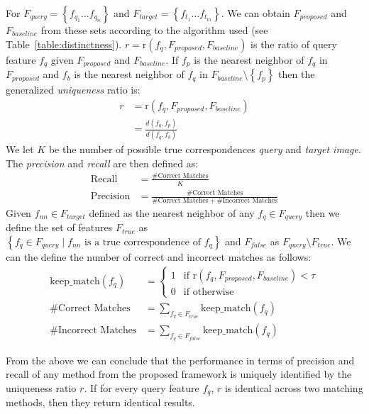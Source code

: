 \documentclass[journal]{IEEEtran}
\newcommand{\twopartdef}[4]
{
	\left\{
		\begin{array}{ll}
			#1 & \mbox{if } #2 \\
			#3 & \mbox{if } #4
		\end{array}
	\right.
}
\begin{document}
For $F_{query} = \left\{f_{q_1} \ldots f_{q_n}\right\}$ and $F_{target} 
= \left\{f_{t_1} \ldots f_{t_m}\right\}$.  We can obtain $F_{proposed}$ 
and $F_{baseline}$ from these sets according to the algorithm used (see 
Table~\ref{table:distinctness}). $r = \text{r}(f_{q}, F_{proposed}, 
F_{baseline})$ is the ratio of query feature $f_{q}$ given 
$F_{proposed}$ and $F_{baseline}$.  If $f_{p}$ is the nearest neighbor 
of $f_{q}$ in $F_{proposed}$ and $f_{b}$ is the nearest neighbor of 
$f_{q}$ in $F_{baseline} \setminus \left\{f_{p}\right\}$ then the 
generalized \emph{uniqueness} ratio is:
\begin{align*}
    r &= \text{r}(f_{q}, F_{proposed}, F_{baseline}) \\
        &= \frac{d(f_{q}, f_{p})}{d(f_{q}, f_{b})}
\end{align*}
We let $K$ be the number of possible true correspondences \emph{query} 
and \emph{target image}. The \emph{precision} and \emph{recall} are then 
defined as:
\begin{align*}
    \textrm{Recall} &= \frac{\#\textrm{Correct Matches}}{K} \\
    \textrm{Precision} &= \frac{\#\textrm{Correct 
    Matches}}{\#\textrm{Correct Matches} + \#\textrm{Incorrect Matches}}
\end{align*}
Given $f_{nn} \in F_{target}$ defined as the nearest neighbor of any 
$f_q \in F_{query}$ then we define the set of features $F_{true}$ as 
$\left\{ f_{q} \in F_{query} \mid f_{nn} \text{ is a true correspondence 
of } f_{q} \right\}$ and $F_{false}$ as $F_{query} \setminus F_{true}$.  
We can the define the number of correct and incorrect matches as 
follows:
\begin{align*}
    \textrm{keep\_match}(f_{q}) &= \twopartdef{ 1 }{\text{r}(f_{q}, 
    F_{proposed}, F_{baseline}) <
    \tau}{0}{\textrm{otherwise}} \\
    \#\textrm{Correct Matches} &= \sum_{f_{q} \in F_{true}} 
    \textrm{keep\_match}(f_{q})\\
    \#\textrm{Incorrect Matches} &= \sum_{f_{q} \in F_{false}}
    \textrm{keep\_match}(f_{q})
\end{align*}

From the above we can conclude that the performance in terms of 
precision and recall of any method from the proposed framework is 
uniquely identified by the uniqueness ratio $r$.  If for every query 
feature $f_{q}$, $r$ is identical across two matching methods, then they 
return identical results. 
\end{document}
